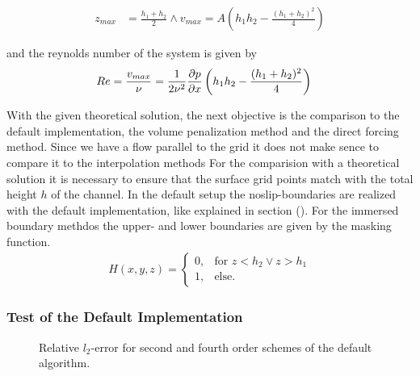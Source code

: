 \begin{align}
z_{max} &= \frac{h_1+h_2}{2} \wedge v_{max} = A\left(h_1h_2 - \frac{(h_1 + h_2)^2}{4}\right)
\end{align}

and the reynolds number of the system is given by
\begin{align}
    Re &= \frac{v_{max} }{\nu} = \frac{1}{2\nu^2}\pdn[p]{x}\left(h_1h_2 - \frac{(h_1 + h_2)^2}{4}\right)
\end{align}



With the given theoretical solution, the next objective is the comparison
to the default implementation, the volume penalization method and the direct forcing method.
Since we have a flow parallel to the grid  it does not make sence to compare it to the interpolation methods
For the comparision with a theoretical solution it is necessary to ensure that the surface grid points match with the total height $h$ of the channel.
In the default setup the noslip-boundaries are realized with the default implementation, like explained in section ().
For the immersed boundary methdos the upper- and lower boundaries are given by the masking function.
\begin{align}
H(x, y, z) = \begin{cases}
                    0, & \text{for \  }  z < h_2 \lor z>h_1 \\
                    1, & \text{else}.
             \end{cases}
\end{align}

\subsubsection{Test of the Default Implementation}

\begin{figure}[!bp]
    \centering
    
    \caption{Relative $l_2$-error for second and fourth order schemes of the default algorithm.\label{fig:ema1}}
\end{figure}

